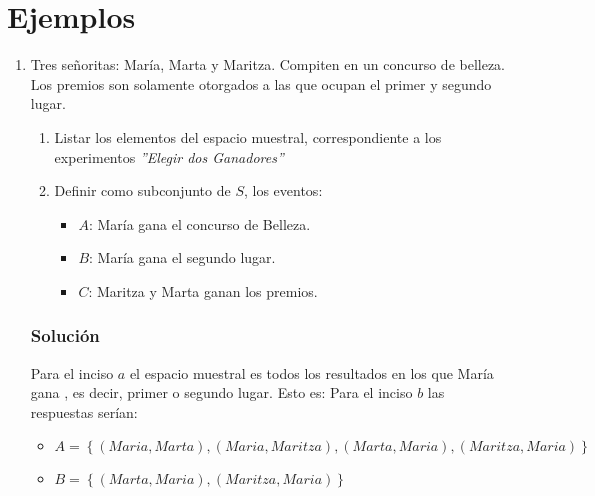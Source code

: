 \section{Ejemplos}
\begin{enumerate}
\item Tres señoritas: María, Marta y Maritza. Compiten en un concurso de belleza. Los premios son solamente otorgados a las que ocupan el primer y segundo lugar.
\begin{enumerate}
\item Listar los elementos del espacio muestral, correspondiente a los experimentos \textit{''Elegir dos Ganadores''}
\item Definir como subconjunto de $S$, los eventos:
\begin{itemize}
\item $A$: María gana el concurso de Belleza.
\item $B$: María gana el segundo lugar.
\item $C$: Maritza y Marta ganan los premios.
\end{itemize}
\end{enumerate}
\subsubsection{Solución}
Para el inciso $a$ el espacio muestral es todos los resultados en los que María gana , es decir, primer o segundo lugar. Esto es:
Para el inciso $b$ las respuestas serían:
\begin{itemize}
\item $A=\left\lbrace (Maria,Marta),(Maria,Maritza),(Marta,Maria),(Maritza,Maria)\right\rbrace $
\item $B=\left\lbrace (Marta,Maria),(Maritza,Maria)\right\rbrace$
\end{itemize}

\end{enumerate}